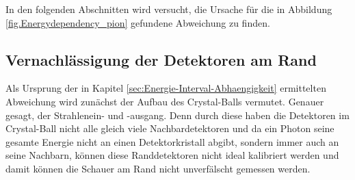 \documentclass[a4paper,11pt,oneside,final,german,openbib,pdftex]{scrbook}
\begin{document}
{%



In den folgenden Abschnitten wird versucht, die Ursache für die in Abbildung \ref{fig.Energydependency_pion} gefundene Abweichung zu finden.


\subsection{Vernachl\"assigung der Detektoren am Rand}
\label{sec:Vernachlaessigung-der-Detektoren-am-Rand}

Als Ursprung der in Kapitel \ref{sec:Energie-Interval-Abhaengigkeit} ermittelten Abweichung wird zun\"achst der Aufbau des Crystal-Balls vermutet. Genauer gesagt, der Strahlenein- und -ausgang. Denn durch diese haben die Detektoren im Crystal-Ball nicht alle gleich viele Nachbardetektoren und da ein Photon seine gesamte Energie nicht an einen Detektorkristall abgibt, sondern immer auch an seine Nachbarn, k\"onnen diese Randdetektoren nicht ideal kalibriert werden und damit k\"onnen die Schauer am Rand nicht unverf\"alscht gemessen werden. 


}
\end{document}
